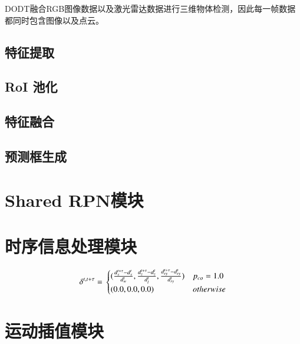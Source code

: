 DODT融合RGB图像数据以及激光雷达数据进行三维物体检测，因此每一帧数据都同时包含图像以及点云。

\subsection{特征提取}

\subsection{RoI 池化}

\subsection{特征融合}

\subsection{预测框生成}

\section{Shared RPN模块}
\label{shared_rpn}





\section{时序信息处理模块}
\label{temporal_module}

\begin{equation}
\delta^{t, t+\tau} = \\
\begin{cases}
(\frac{d_{x}^{t+\tau} - d_{x}^{t}}{d^t_{w}}, \frac{d_{z}^{t+\tau} - d_{z}^{t} }{d^t_{l}}, \frac{d_{ry}^{t+\tau} - d_{ry}^{t}}{d^t_{ry}}) & p_{co} = 1.0 \\
(0.0,0.0, 0.0) &  otherwise
\end{cases}
\end{equation}

\section{运动插值模块}
\label{interpolation}

